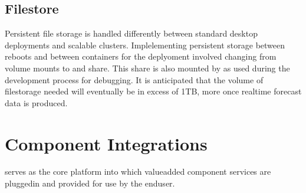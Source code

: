 \documentclass[letterpaper,12pt,english,openany,oneside]{sphinxmanual}
\begin{document}
\subsection{Filestore}
\label{\detokenize{euidev/infrastructure/index:filestore}}
\sphinxAtStartPar
Persistent file storage is handled differently between standard  desktop deployments and scalable  clusters. Implelementing persistent storage between reboots and between containers for the  deplyoment involved changing from volume mounts to and  share. This  share is also mounted by as   used during the development process for debugging. It is anticipated that the volume of filestorage needed will eventually be in excess of 1TB, more once real\sphinxhyphen{}time forecast data is produced.

\sphinxstepscope


\section{Component Integrations}
\label{\detokenize{euidev/integrations/index:component-integrations}}\label{\detokenize{euidev/integrations/index::doc}}
\sphinxAtStartPar
{} serves as the core platform into which value\sphinxhyphen{}added component services are plugged\sphinxhyphen{}in and provided for use by the end\sphinxhyphen{}user.
\end{document}
